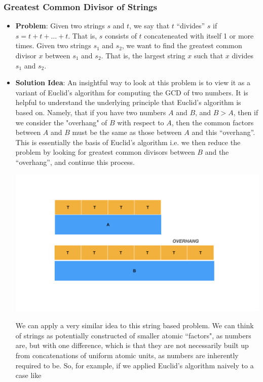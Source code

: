 \documentclass[10pt,a4paper]{article}
\begin{document}
\subsubsection*{Greatest Common Divisor of Strings}
\begin{itemize}
    \item \textbf{Problem}: Given two strings $s$ and $t$, we say that $t$ ``divides'' $s$ if $s = t + t + \dots + t$. That is, $s$ consists of $t$ concateneated with  itself 1 or more times. Given two strings $s_1$ and $s_2$, we want to find the greatest common divisor $x$ between $s_1$ and $s_2$. That is, the largest string $x$ such that $x$ divides $s_1$ and $s_2$.
    \item \textbf{Solution Idea}: An insightful way to look at this problem is to view it as a variant of Euclid's algorithm for computing the GCD of two numbers. It is helpful to understand the underlying principle that Euclid's algorithm is based on. Namely, that if you have two numbers $A$ and $B$, and $B > A$, then if we consider the "overhang" of $B$ with respect to $A$, then the common factors between $A$ and $B$ must be the same as those between $A$ and this ``overhang''. This is essentially the basis of Euclid's algorithm i.e. we then reduce the problem by looking for greatest common divisors between $B$ and the ``overhang'', and continue this process.
    \begin{center}
        \includegraphics[scale=0.15]{diagrams/algorithms_notes_diagrams/algorithms_notes_diagrams.001.png}
    \end{center}
    We can apply a very similar idea to this string based problem. We can think of strings as potentially constructed of smaller atomic ``factors", as numbers are, but with one difference, which is that they are not necessarily built up from concatenations of uniform atomic units, as numbers are inherently required to be. So, for example, if we applied Euclid's algorithm naively to a case like

\end{itemize}
\end{document}

